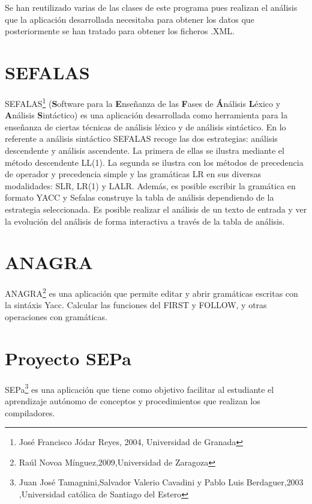 Se han reutilizado varias de las clases de este programa pues realizan el análisis que la aplicación desarrollada necesitaba para obtener los datos que posteriormente se han tratado para obtener los ficheros .XML.


\section{SEFALAS \cite{SEFALAS}}
SEFALAS\footnote{José Francisco Jódar Reyes, 2004, Universidad de Granada} (\textbf{S}oftware para la \textbf{E}nseñanza de las \textbf{F}ases de \textbf{Á}nálisis \textbf{L}éxico y \textbf{A}nálisis \textbf{S}intáctico) es una aplicación desarrollada como herramienta para la enseñanza de ciertas técnicas de análisis léxico y de análisis sintáctico. En lo referente a análisis sintáctico SEFALAS recoge las dos estrategias: análisis descendente y análisis ascendente. La primera de ellas se ilustra mediante el método descendente LL(1). La segunda se ilustra con los métodos de precedencia de operador y precedencia simple y las gramáticas LR en sus diversas modalidades: SLR, LR(1) y LALR. Además, es posible escribir la gramática en formato YACC y Sefalas construye la tabla de análisis dependiendo de la estrategia seleccionada. Es posible realizar el análisis de un texto de entrada y ver la evolución del análisis de forma interactiva a través de la tabla de análisis.


\section{ANAGRA \cite{anagra}}

ANAGRA\footnote{Raúl Novoa Mínguez,2009,Universidad de Zaragoza} es una aplicación que permite editar y abrir gramáticas escritas con la sintáxis Yacc.
Calcular las funciones del FIRST y FOLLOW, y otras operaciones con gramáticas.

\section{Proyecto SEPa \cite{SEPa}}

SEPa\footnote{Juan José Tamagnini,Salvador Valerio Cavadini y
Pablo Luis Berdaguer,2003 ,Universidad católica de Santiago del Estero} es una aplicación que tiene como objetivo facilitar al estudiante el aprendizaje autónomo de conceptos y procedimientos que realizan los compiladores.

